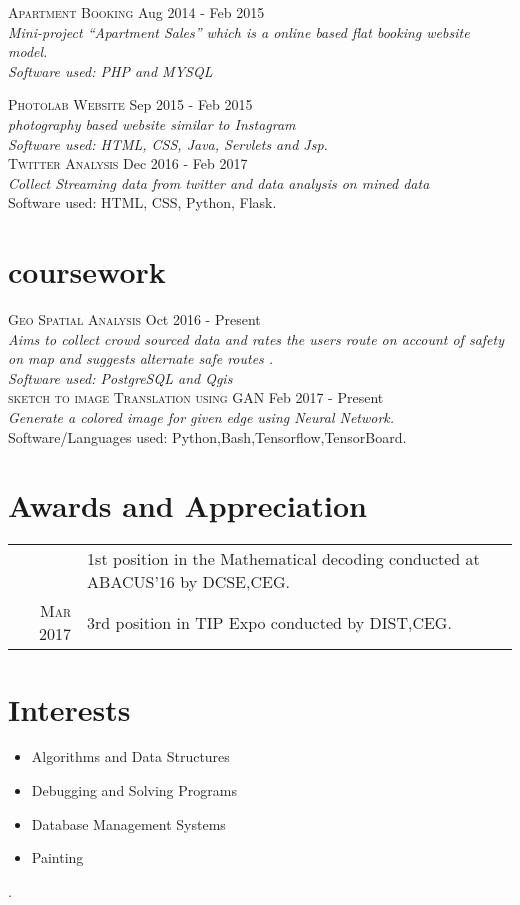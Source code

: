 \documentclass[a4paper,10pt]{article}
\begin{document}
{\textsc{ Apartment Booking} \hfill Aug 2014 - Feb 2015 \\
\emph{ Mini-project “Apartment Sales” which is a online based flat booking website model.\\
Software used: PHP and MYSQL} \\
{\textsc{ Photolab Website} \hfill Sep 2015 - Feb 2015 \\
\emph{photography based website {similar to Instagram} \\ 
Software used: HTML, CSS, Java, Servlets and Jsp.} \\
{\textsc{ Twitter Analysis} \hfill Dec 2016 - Feb 2017 \\
\emph{Collect Streaming data from twitter and data analysis on mined data} \\ 
Software used: HTML, CSS, Python, Flask.} 

\section{coursework}
{\textsc{ Geo Spatial Analysis} \hfill Oct 2016 - Present \\
\emph{ Aims to collect crowd sourced data and rates the users route on account of safety on map and suggests alternate safe routes .\\
Software used: PostgreSQL and Qgis} \\
{\textsc{ sketch to image Translation using GAN} \hfill Feb 2017 - Present \\
\emph{Generate a colored image for given edge using Neural Network.}\\  
Software/Languages used: Python,Bash,Tensorflow,TensorBoard.} \\

\section{Awards and Appreciation}
\begin{tabular}{rl}
{ \textsc{Apr} 2016 &1st position in the Mathematical decoding conducted at  ABACUS’16 by DCSE,CEG.}\\
\textsc{Mar} 2017 & 3rd position in TIP Expo conducted by DIST,CEG.
\end{tabular}

\section{Interests}
\begin{itemize}
\item Algorithms and Data Structures
\item Debugging and Solving Programs
\item Database Management Systems
\item Painting
\end{itemize}.

}}}
\end{document}
